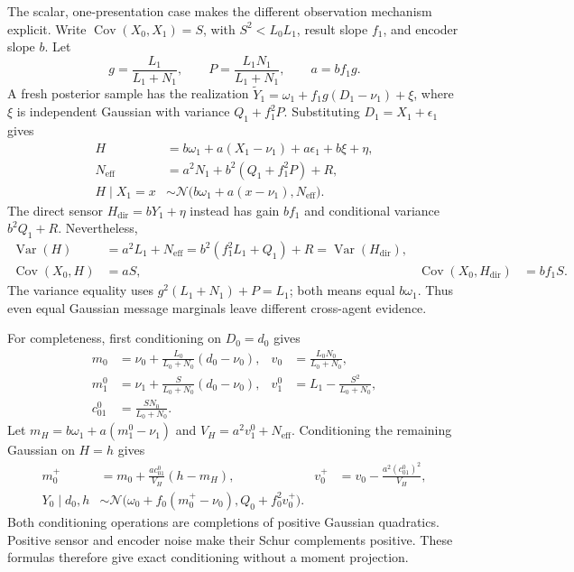 The scalar, one-presentation case makes the different observation mechanism explicit. Write $\operatorname{Cov}(X_0,X_1)=S$, with $S^2<L_0L_1$, result slope $f_1$, and encoder slope $b$. Let
\begin{equation}
 g=\frac{L_1}{L_1+N_1},\qquad
 P=\frac{L_1N_1}{L_1+N_1},\qquad a=bf_1g.
 \label{imem:scalar-gain}
\end{equation}
A fresh posterior sample has the realization
$\widetilde Y_1=\omega_1+f_1g(D_1-\nu_1)+\xi$, where $\xi$ is independent Gaussian with variance $Q_1+f_1^2P$. Substituting $D_1=X_1+\epsilon_1$ gives
\begin{equation}
 \begin{aligned}
 H&=b\omega_1+a(X_1-\nu_1)+a\epsilon_1+b\xi+\eta,\\
 N_{\mathrm{eff}}&=a^2N_1+b^2(Q_1+f_1^2P)+R,\\
 H\mid X_1=x&\sim
 \mathcal N\bigl(b\omega_1+a(x-\nu_1),N_{\mathrm{eff}}\bigr).
 \end{aligned}
 \label{imem:scalar-message}
\end{equation}
The direct sensor $H_{\mathrm{dir}}=bY_1+\eta$ instead has gain $bf_1$ and conditional variance $b^2Q_1+R$. Nevertheless,
\begin{equation}
 \begin{aligned}
 \operatorname{Var}(H)&=a^2L_1+N_{\mathrm{eff}}
 =b^2(f_1^2L_1+Q_1)+R
 =\operatorname{Var}(H_{\mathrm{dir}}),\\
 \operatorname{Cov}(X_0,H)&=aS,&
 \operatorname{Cov}(X_0,H_{\mathrm{dir}})&=bf_1S.
 \end{aligned}
 \label{imem:scalar-calibration}
\end{equation}
The variance equality uses $g^2(L_1+N_1)+P=L_1$; both means equal $b\omega_1$. Thus even equal Gaussian message marginals leave different cross-agent evidence.

For completeness, first conditioning on $D_0=d_0$ gives
\begin{equation}
 \begin{aligned}
 m_0&=\nu_0+\frac{L_0}{L_0+N_0}(d_0-\nu_0),&
 v_0&=\frac{L_0N_0}{L_0+N_0},\\
 m_1^0&=\nu_1+\frac{S}{L_0+N_0}(d_0-\nu_0),&
 v_1^0&=L_1-\frac{S^2}{L_0+N_0},\\
 c_{01}^0&=\frac{SN_0}{L_0+N_0}.&&
 \end{aligned}
\end{equation}
Let $m_H=b\omega_1+a(m_1^0-\nu_1)$ and $V_H=a^2v_1^0+N_{\mathrm{eff}}$. Conditioning the remaining Gaussian on $H=h$ gives
\begin{equation}
 \begin{aligned}
 m_0^+&=m_0+\frac{ac_{01}^0}{V_H}(h-m_H),&
 v_0^+&=v_0-\frac{a^2(c_{01}^0)^2}{V_H},\\
 Y_0\mid d_0,h&\sim
 \mathcal N\bigl(\omega_0+f_0(m_0^+-\nu_0),Q_0+f_0^2v_0^+\bigr).
 \end{aligned}
 \label{imem:scalar-receiver}
\end{equation}
Both conditioning operations are completions of positive Gaussian quadratics. Positive sensor and encoder noise make their Schur complements positive. These formulas therefore give exact conditioning without a moment projection.

